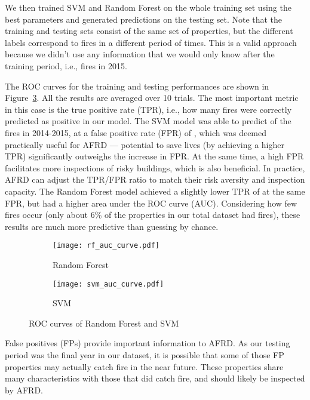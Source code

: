 \documentclass{sig-alternate-05-2015}
\begin{document}
{We then trained SVM and Random Forest on the whole training set using the best parameters and generated predictions on the testing set. Note that the training and testing sets consist of the same set of properties, but the different labels correspond to fires in a different period of times. This is a valid approach because we didn't use any information that we would only know after the training period, i.e., fires in 2015.

The ROC curves for the training and testing performances are shown in Figure~\ref{fig:roc_curve}. 
All the results are averaged over 10 trials. The most important metric in this case is the true positive rate (TPR), i.e., how many fires were correctly predicted as positive in our model. 
The SVM model was able to predict  of the fires in 2014-2015, at a false positive rate (FPR) of , 
which was deemed practically useful for AFRD --- potential to save lives (by achieving a higher TPR) significantly outweighs the increase in FPR. At the same time, a high FPR facilitates more inspections of risky buildings, which is also beneficial. In practice, AFRD can adjust the TPR/FPR ratio to match their risk aversity and inspection capacity.
The Random Forest model achieved a slightly lower TPR of  at the same FPR, but had a higher area under the ROC curve (AUC). 
Considering how few fires occur (only about 6\% of the properties in our total dataset had fires), these results are much more predictive than guessing by chance.

\begin{figure}[!t]
    \centering
     \begin{subfigure}[b]{0.32\textwidth}
        \texttt{[image: rf\_auc\_curve.pdf]}
        \caption{Random Forest}
         \label{fig:rf_curve}
     \end{subfigure}
    \begin{subfigure}[b]{0.32\textwidth}
        \texttt{[image: svm\_auc\_curve.pdf]}
        \caption{SVM}
        \label{fig:svm_curve}
     \end{subfigure}
          \caption{ROC curves of Random Forest and SVM}\label{fig:animals}
          \label{fig:roc_curve}
\end{figure}


False positives (FPs) provide important information to AFRD. As our testing period was the final year in our dataset, 
it is possible that some of those FP properties may actually catch fire in the near future. These properties share many characteristics with those  that did catch fire, and should likely be inspected by AFRD.

}
\end{document}
